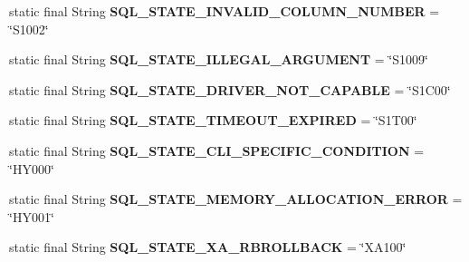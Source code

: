 \begin{DoxyCompactItemize}
static final String {\bfseries S\+Q\+L\+\_\+\+S\+T\+A\+T\+E\+\_\+\+I\+N\+V\+A\+L\+I\+D\+\_\+\+C\+O\+L\+U\+M\+N\+\_\+\+N\+U\+M\+B\+ER} = \char`\"{}S1002\char`\"{}
\item 
\mbox{\label{classcom_1_1mysql_1_1jdbc_1_1_s_q_l_error_a57957f98c0a86f53f1a9c87bcb129e33}} 
static final String {\bfseries S\+Q\+L\+\_\+\+S\+T\+A\+T\+E\+\_\+\+I\+L\+L\+E\+G\+A\+L\+\_\+\+A\+R\+G\+U\+M\+E\+NT} = \char`\"{}S1009\char`\"{}
\item 
\mbox{\label{classcom_1_1mysql_1_1jdbc_1_1_s_q_l_error_ae8070b42f367808b01bd09cb8878b801}} 
static final String {\bfseries S\+Q\+L\+\_\+\+S\+T\+A\+T\+E\+\_\+\+D\+R\+I\+V\+E\+R\+\_\+\+N\+O\+T\+\_\+\+C\+A\+P\+A\+B\+LE} = \char`\"{}S1\+C00\char`\"{}
\item 
\mbox{\label{classcom_1_1mysql_1_1jdbc_1_1_s_q_l_error_a9fb83cf19288405b368985a283354fe4}} 
static final String {\bfseries S\+Q\+L\+\_\+\+S\+T\+A\+T\+E\+\_\+\+T\+I\+M\+E\+O\+U\+T\+\_\+\+E\+X\+P\+I\+R\+ED} = \char`\"{}S1\+T00\char`\"{}
\item 
\mbox{\label{classcom_1_1mysql_1_1jdbc_1_1_s_q_l_error_aee727c383801259856696cf1ab0faa0a}} 
static final String {\bfseries S\+Q\+L\+\_\+\+S\+T\+A\+T\+E\+\_\+\+C\+L\+I\+\_\+\+S\+P\+E\+C\+I\+F\+I\+C\+\_\+\+C\+O\+N\+D\+I\+T\+I\+ON} = \char`\"{}H\+Y000\char`\"{}
\item 
\mbox{\label{classcom_1_1mysql_1_1jdbc_1_1_s_q_l_error_a6230b246d3030667908c85097ca18f93}} 
static final String {\bfseries S\+Q\+L\+\_\+\+S\+T\+A\+T\+E\+\_\+\+M\+E\+M\+O\+R\+Y\+\_\+\+A\+L\+L\+O\+C\+A\+T\+I\+O\+N\+\_\+\+E\+R\+R\+OR} = \char`\"{}H\+Y001\char`\"{}
\item 
\mbox{\label{classcom_1_1mysql_1_1jdbc_1_1_s_q_l_error_a0ce10851e4e902e4fe883bd08f3cc711}} 
static final String {\bfseries S\+Q\+L\+\_\+\+S\+T\+A\+T\+E\+\_\+\+X\+A\+\_\+\+R\+B\+R\+O\+L\+L\+B\+A\+CK} = \char`\"{}X\+A100\char`\"{}
\item 
\mbox{\label{classcom_1_1mysql_1_1jdbc_1_1_s_q_l_error_a9411fc6afc20922c09176a4214cd0130}} 

\end{DoxyCompactItemize}
